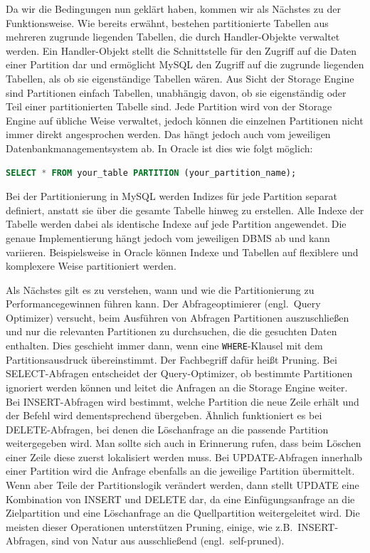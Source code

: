 Da wir die Bedingungen nun geklärt haben, kommen wir als Nächstes zu der Funktionsweise.
Wie bereits erwähnt, bestehen partitionierte Tabellen aus mehreren zugrunde liegenden Tabellen, die durch Handler-Objekte verwaltet werden.
Ein Handler-Objekt stellt die Schnittstelle für den Zugriff auf die Daten einer Partition dar und ermöglicht MySQL den Zugriff auf die zugrunde liegenden Tabellen, als ob sie eigenständige Tabellen wären.
Aus Sicht der Storage Engine sind Partitionen einfach Tabellen, unabhängig davon, ob sie eigenständig oder Teil einer partitionierten Tabelle sind.
Jede Partition wird von der Storage Engine auf übliche Weise verwaltet, jedoch können die einzelnen Partitionen nicht immer direkt angesprochen werden.
Das hängt jedoch auch vom jeweiligen Datenbankmanagementsystem ab.
In Oracle ist dies wie folgt möglich:

\vspace{-5pt}
\begin{lstlisting}[language=SQL,label={lst:direct_partition}]
SELECT * FROM your_table PARTITION (your_partition_name);
\end{lstlisting}
\vspace{-7pt}

Bei der Partitionierung in MySQL werden Indizes für jede Partition separat definiert, anstatt sie über die gesamte Tabelle hinweg zu erstellen.
Alle Indexe der Tabelle werden dabei als identische Indexe auf jede Partition angewendet.
Die genaue Implementierung hängt jedoch vom jeweiligen DBMS ab und kann variieren.
Beispielsweise in Oracle können Indexe und Tabellen auf flexiblere und komplexere Weise partitioniert werden.

Als Nächstes gilt es zu verstehen, wann und wie die Partitionierung zu Performancegewinnen führen kann.
Der Abfrageoptimierer (engl.\ Query Optimizer) versucht, beim Ausführen von Abfragen Partitionen auszuschließen und nur die relevanten Partitionen zu durchsuchen, die die gesuchten Daten enthalten.
Dies geschieht immer dann, wenn eine \texttt{WHERE}-Klausel mit dem Partitionsausdruck übereinstimmt.
Der Fachbegriff dafür heißt Pruning.
Bei SELECT-Abfragen entscheidet der Query-Optimizer, ob bestimmte Partitionen ignoriert werden können und leitet die Anfragen an die Storage Engine weiter.
Bei INSERT-Abfragen wird bestimmt, welche Partition die neue Zeile erhält und der Befehl wird dementsprechend übergeben.
Ähnlich funktioniert es bei DELETE-Abfragen, bei denen die Löschanfrage an die passende Partition weitergegeben wird.
Man sollte sich auch in Erinnerung rufen, dass beim Löschen einer Zeile diese zuerst lokalisiert werden muss.
Bei UPDATE-Abfragen innerhalb einer Partition wird die Anfrage ebenfalls an die jeweilige Partition übermittelt.
Wenn aber Teile der Partitionslogik verändert werden, dann stellt UPDATE eine Kombination von INSERT und DELETE dar, da eine Einfügungsanfrage an die Zielpartition und eine Löschanfrage an die Quellpartition weitergeleitet wird.
Die meisten dieser Operationen unterstützen Pruning, einige, wie z.B.\ INSERT-Abfragen, sind von Natur aus ausschließend (engl.\ self-pruned).

